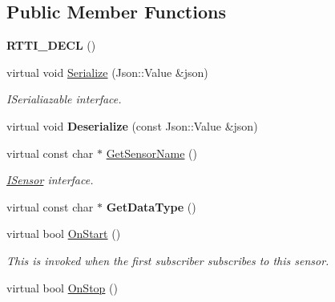 \subsection*{Public Member Functions}
\begin{DoxyCompactItemize}
\item 
\mbox{\label{class_laser_ad6b0a8910200a1eafd24a52cef254a7e}} 
{\bfseries R\+T\+T\+I\+\_\+\+D\+E\+CL} ()
\item 
\mbox{\label{class_laser_a546cecc614056a8c0e737f22f7ba256a}} 
virtual void \hyperlink{class_laser_a546cecc614056a8c0e737f22f7ba256a}{Serialize} (Json\+::\+Value \&json)
\begin{DoxyCompactList}\small\item\em I\+Serialiazable interface. \end{DoxyCompactList}\item 
\mbox{\label{class_laser_ae07839b0aa38285f2000cfcc6f2c1199}} 
virtual void {\bfseries Deserialize} (const Json\+::\+Value \&json)
\item 
\mbox{\label{class_laser_afd15243de85b58b83f57f9b58919eae5}} 
virtual const char $\ast$ \hyperlink{class_laser_afd15243de85b58b83f57f9b58919eae5}{Get\+Sensor\+Name} ()
\begin{DoxyCompactList}\small\item\em \hyperlink{class_i_sensor}{I\+Sensor} interface. \end{DoxyCompactList}\item 
\mbox{\label{class_laser_abe8a25f833da3ef40facb5bb2f8e8453}} 
virtual const char $\ast$ {\bfseries Get\+Data\+Type} ()
\item 
\mbox{\label{class_laser_a974a852811068a542c37f8d9dd1f257f}} 
virtual bool \hyperlink{class_laser_a974a852811068a542c37f8d9dd1f257f}{On\+Start} ()
\begin{DoxyCompactList}\small\item\em This is invoked when the first subscriber subscribes to this sensor. \end{DoxyCompactList}\item 
\mbox{\label{class_laser_a58df3d88df4d4cb7c204b2b173eb9f0d}} 
virtual bool \hyperlink{class_laser_a58df3d88df4d4cb7c204b2b173eb9f0d}{On\+Stop} ()

\end{DoxyCompactItemize}
